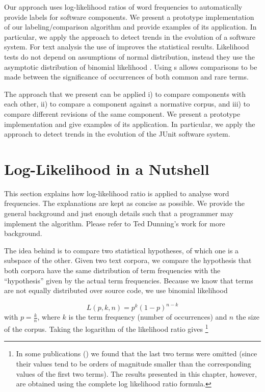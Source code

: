 Our approach uses log-likelihood ratios of word frequencies to automatically provide labels for software components. We present a prototype implementation of our labeling/comparison algorithm and provide examples of its application. In particular, we apply the approach to detect trends in the evolution of a software system. For text analysis the use of \loglr improves the statistical results. Likelihood tests do not depend on assumptions of normal distribution, instead they use the asymptotic distribution of binomial likelihood \cite{Dunning}. Using \loglr{}s allows comparisons to be made between the significance of occurrences of both common and rare terms.

The approach that we present can be applied i) to compare components with each other, ii) to compare a component against a normative corpus, and iii) to compare different revisions of the same component. We present a prototype implementation and give examples of its application. In particular, we apply the approach to detect trends in the evolution of the JUnit software system.

\section{Log-Likelihood in a Nutshell}\label{nutshell}

This section explains how log-likelihood ratio is applied to analyse word frequencies. The explanations are kept as concise as possible. We provide the general background and just enough details such that a programmer may implement the algorithm. Please refer to Ted Dunning's work \cite{Dunning} for more background.

The idea behind \loglr is to compare two statistical hypotheses, of which one is a subspace of the other. Given two text corpora, we compare the hypothesis that both corpora have the same distribution of term frequencies with the ``hypothesis'' given by the actual term frequencies. Because we know that terms are not equally distributed over source code, we use binomial likelihood

$$ L(p,k,n) = p^k ( 1 - p) ^ { n - k }$$
\noindent
with $p = \frac{k}{n}$, where $k$ is the term frequency (\ie number of occurrences) and $n$ the size of the corpus. Taking the logarithm of the likelihood ratio gives
\footnote{In some publications (\eg \cite{Rayson}) we found that the last two terms were omitted (since their values tend to be orders of magnitude smaller than the corresponding values of the first two terms). The results presented in this chapter, however, are obtained using the complete log likelihood ratio formula.}

